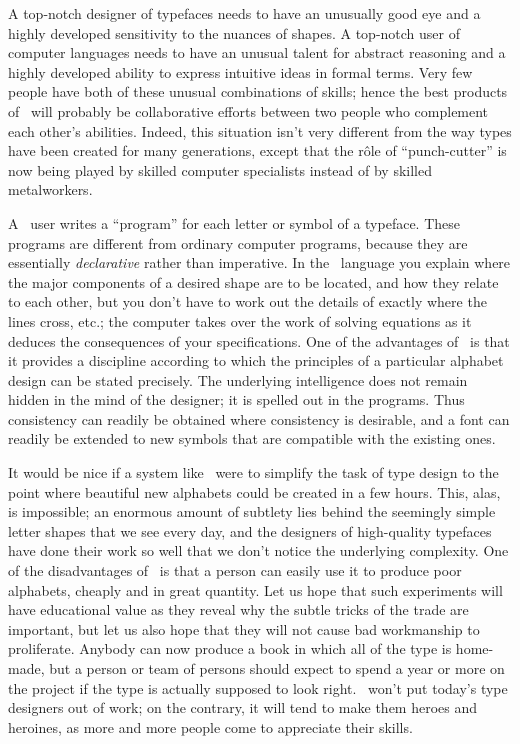 {A top-notch designer of typefaces needs to have an unusually good eye
and a highly developed sensitivity to the nuances of shapes.
A top-notch user of computer languages needs to have an unusual
talent for abstract reasoning and a highly developed ability to
express intuitive ideas in formal terms. Very few people have both
of these unusual combinations of skills; hence the best products of
\MF\ will probably be collaborative efforts between two
people who complement each other's abilities. Indeed, this situation
isn't very different from the way types have been created for many
generations, except that the r\^ole of ``punch-cutter'' is now being
played by skilled computer specialists instead of by skilled
metalworkers.

A \MF\ user writes a ``program'' for each letter or symbol of a typeface.
These programs are different from ordinary computer programs,
because they are essentially {\sl declarative\/} rather than imperative.
In the \MF\ language you explain where the major components of a
desired shape are to be located, and how they relate to each other,
but you don't have to work out the details of exactly where the lines
cross, etc.; the computer takes over the work of solving equations as it
deduces the consequences of your specifications. One of the advantages of
\MF\ is that it provides a discipline according to which the principles
of a particular alphabet design can be stated precisely. The underlying
intelligence does not remain hidden in the mind of the designer; it is
spelled out in the programs. Thus consistency can readily be obtained
where consistency is desirable, and a font can readily be extended to
new symbols that are compatible with the existing ones.

It would be nice if a system like \MF\ were to simplify the task of type
design to the point where beautiful new alphabets could be created in a
few hours. This, alas, is impossible; an enormous amount of subtlety lies
behind the seemingly simple letter shapes that we see every day, and the
designers of high-quality typefaces have done their work so well that we
don't notice the underlying complexity.  One of the disadvantages of \MF\
is that a person can easily use it to produce poor alphabets, cheaply and
in great quantity. Let us hope that such experiments will have educational
value as they reveal why the subtle tricks of the trade are important, but
let us also hope that they will not cause bad workmanship to proliferate.
Anybody can now produce a book in which all of the type is home-made, but
a person or team of persons should expect to spend a year or more on the
project if the type is actually supposed to look right. \MF\ won't put
today's type designers out of work; on the contrary, it will tend to make
them heroes and heroines, as more and more people come to appreciate their
skills.

}
